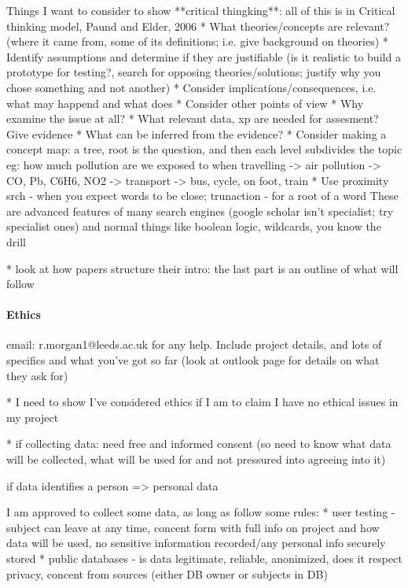 \documentclass[a4paper]{article}
\begin{document}
        Things I want to consider to show **critical thingking**:
        all of this is in Critical thinking model, Paund and Elder, 2006
        * What theories/concepts are relevant?
          (where it came from, some of its definitions; i.e. give background on theories)
        * Identify assumptions and determine if they are justifiable
          (is it realistic to build a prototype for testing?, search for opposing
          theories/solutions; justify why you chose something and not another)
        * Consider implications/consequences, i.e. what may happend and what does
        * Consider other points of view
        * Why examine the issue at all?
        * What relevant data, xp are needed for assesment? Give evidence
        * What can be inferred from the evidence?
        * Consider making a concept map: a tree, root is the question, and then each level subdivides the topic
          eg: how much pollution are we exposed to when travelling -> air pollution -> CO, Pb, C6H6, NO2
                                                 -> transport    -> bus, cycle, on foot, train
        * Use proximity srch - when you expect words to be close; trunaction - for a root of a word
        These are advanced features of many search engines (google scholar isn't specialist; try specialist ones)
        and normal things like boolean logic, wildcards, you know the drill

        * look at how papers structure their intro: the last part is an outline of what will follow

        \paragraph{Ethics}
        email: r.morgan1@leeds.ac.uk for any help. Include project details, and
        lots of specifics and what you've got so far (look at outlook page for
        details on what they ask for)

        * I need to show I've considered ethics if I am to claim I have no
          ethical issues in my project

        * if collecting data: need free and informed consent (so need to know
          what data will be collected, what will be used for and not pressured
          into agreeing into it)

          if data identifies a person => personal data

          I am approved to collect some data, as long as follow some rules:
          * user testing - subject can leave at any time, concent form with full
            info on project and how data will be used, no sensitive information
            recorded/any personal info securely stored
          * public databases - is data legitimate, reliable, anonimized, does
            it respect privacy, concent from sources (either DB owner or subjects
            in DB)
\end{document}
